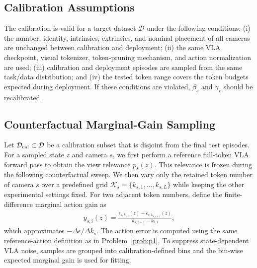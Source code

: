\documentclass[lettersize,journal]{IEEEtran}
\theoremstyle{custom}
\begin{document}
\subsection{Calibration Assumptions}
The calibration is valid for a target dataset $\mathcal D$ under the following conditions: (i) the number, identity, intrinsics, extrinsics, and nominal placement of all cameras are unchanged between calibration and deployment; (ii) the same VLA checkpoint, visual tokenizer, token-pruning mechanism, and action normalization are used; (iii) calibration and deployment episodes are sampled from the same task/data distribution; and (iv) the tested token range covers the token budgets expected during deployment. If these conditions are violated, $\beta_s$ and $\gamma_s$ should be recalibrated.

\subsection{Counterfactual Marginal-Gain Sampling}
Let $\mathcal D_{\rm cal}\subset\mathcal D$ be a calibration subset that is disjoint from the final test episodes. For a sampled state $z$ and camera $s$, we first perform a reference full-token VLA forward pass to obtain the view relevance $p_s(z)$. This relevance is frozen during the following counterfactual sweep. We then vary only the retained token number of camera $s$ over a predefined grid $\mathcal K_s=\{k_{s,1},\ldots,k_{s,L}\}$ while keeping the other experimental settings fixed. For two adjacent token numbers, define the finite-difference marginal action gain as
\begin{align}\label{eq:cal_marginal}
    y_{s,i}(z)
    =\frac{\epsilon_{s,k_{s,i}}(z)-\epsilon_{s,k_{s,i+1}}(z)}
    {k_{s,i+1}-k_{s,i}},
\end{align}
which approximates $-\Delta\epsilon/\Delta k_s$. The action error is computed using the same reference-action definition as in Problem~\ref{prob:p1}. To suppress state-dependent VLA noise, samples are grouped into calibration-defined bins and the bin-wise expected marginal gain is used for fitting.
\end{document}
